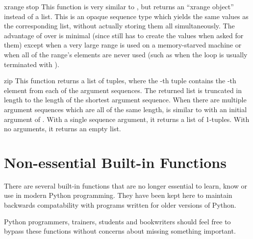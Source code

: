 \begin{funcdesc}{xrange}{ stop}
  This function is very similar to , but returns an
  ``xrange object'' instead of a list.  This is an opaque sequence
  type which yields the same values as the corresponding list, without
  actually storing them all simultaneously.  The advantage of
   over  is minimal (since
   still has to create the values when asked for
  them) except when a very large range is used on a memory-starved
  machine or when all of the range's elements are never used (such as
  when the loop is usually terminated with ).
\end{funcdesc}

\begin{funcdesc}{zip}{}
  This function returns a list of tuples, where the -th tuple contains
  the -th element from each of the argument sequences.
  The returned list is truncated in length to the length of
  the shortest argument sequence.  When there are multiple argument
  sequences which are all of the same length,  is
  similar to  with an initial argument of .
  With a single sequence argument, it returns a list of 1-tuples.
  With no arguments, it returns an empty list.

\end{funcdesc}




\section{Non-essential Built-in Functions \label{non-essential-built-in-funcs}}

There are several built-in functions that are no longer essential to learn,
know or use in modern Python programming.  They have been kept here to
maintain backwards compatability with programs written for older versions
of Python.

Python programmers, trainers, students and bookwriters should feel free to
bypass these functions without concerns about missing something important.


